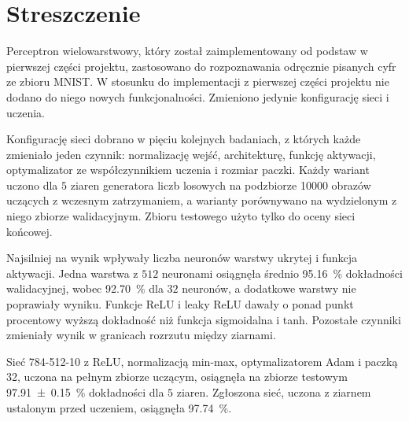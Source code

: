 \section*{Streszczenie}
\label{sec:abstract}

Perceptron wielowarstwowy, który został zaimplementowany od podstaw w pierwszej części projektu, zastosowano do rozpoznawania odręcznie pisanych cyfr ze zbioru MNIST. W stosunku do implementacji z pierwszej części projektu nie dodano do niego nowych funkcjonalności. Zmieniono jedynie konfigurację sieci i uczenia.

Konfigurację sieci dobrano w pięciu kolejnych badaniach, z których każde zmieniało jeden czynnik: normalizację wejść, architekturę, funkcję aktywacji, optymalizator ze współczynnikiem uczenia i rozmiar paczki. Każdy wariant uczono dla $5$ ziaren generatora liczb losowych na podzbiorze \num{10000} obrazów uczących z wczesnym zatrzymaniem, a warianty porównywano na wydzielonym z niego zbiorze walidacyjnym. Zbioru testowego użyto tylko do oceny sieci końcowej.

Najsilniej na wynik wpływały liczba neuronów warstwy ukrytej i funkcja aktywacji. Jedna warstwa z $512$ neuronami osiągnęła średnio \qty{95.16}{\percent} dokładności walidacyjnej, wobec \qty{92.70}{\percent} dla $32$ neuronów, a dodatkowe warstwy nie poprawiały wyniku. Funkcje ReLU i leaky ReLU dawały o ponad punkt procentowy wyższą dokładność niż funkcja sigmoidalna i tanh. Pozostałe czynniki zmieniały wynik w granicach rozrzutu między ziarnami.

Sieć \mbox{784-512-10} z ReLU, normalizacją min-max, optymalizatorem Adam i paczką 32, uczona na pełnym zbiorze uczącym, osiągnęła na zbiorze testowym \qty{97.91 +- 0.15}{\percent} dokładności dla $5$ ziaren. Zgłoszona sieć, uczona z ziarnem ustalonym przed uczeniem, osiągnęła \qty{97.74}{\percent}.
